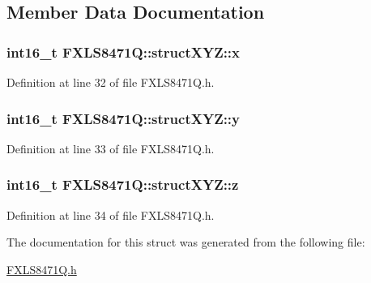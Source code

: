 \subsection{Member Data Documentation}
\subsubsection[{\texorpdfstring{x}{x}}]{\setlength{\rightskip}{0pt plus 5cm}int16\+\_\+t F\+X\+L\+S8471\+Q\+::struct\+X\+Y\+Z\+::x}\hypertarget{struct_f_x_l_s8471_q_1_1struct_x_y_z_a75aa25b4a345e62c9526e0951f78da69}{}\label{struct_f_x_l_s8471_q_1_1struct_x_y_z_a75aa25b4a345e62c9526e0951f78da69}


Definition at line 32 of file F\+X\+L\+S8471\+Q.\+h.

\subsubsection[{\texorpdfstring{y}{y}}]{\setlength{\rightskip}{0pt plus 5cm}int16\+\_\+t F\+X\+L\+S8471\+Q\+::struct\+X\+Y\+Z\+::y}\hypertarget{struct_f_x_l_s8471_q_1_1struct_x_y_z_a504ed67fe6a31f16a8e48f48d2c6437f}{}\label{struct_f_x_l_s8471_q_1_1struct_x_y_z_a504ed67fe6a31f16a8e48f48d2c6437f}


Definition at line 33 of file F\+X\+L\+S8471\+Q.\+h.

\subsubsection[{\texorpdfstring{z}{z}}]{\setlength{\rightskip}{0pt plus 5cm}int16\+\_\+t F\+X\+L\+S8471\+Q\+::struct\+X\+Y\+Z\+::z}\hypertarget{struct_f_x_l_s8471_q_1_1struct_x_y_z_ac5d90008571d14b4b7a370c8f4e58910}{}\label{struct_f_x_l_s8471_q_1_1struct_x_y_z_ac5d90008571d14b4b7a370c8f4e58910}


Definition at line 34 of file F\+X\+L\+S8471\+Q.\+h.



The documentation for this struct was generated from the following file\+:\begin{DoxyCompactItemize}
\item 
\hyperlink{_f_x_l_s8471_q_8h}{F\+X\+L\+S8471\+Q.\+h}\end{DoxyCompactItemize}
